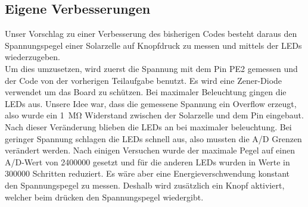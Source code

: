 \subsection{Eigene Verbesserungen}
Unser Vorschlag zu einer Verbesserung des bisherigen Codes besteht daraus den Spannungspegel einer Solarzelle auf Knopfdruck zu messen und mittels der LEDs wiederzugeben. \\ 
Um dies umzusetzen, wird zuerst die Spannung mit dem Pin PE2 gemessen und der Code von der vorherigen Teilaufgabe benutzt. Es wird eine Zener-Diode verwendet um das Board zu schützen.  Bei maximaler Beleuchtung gingen die LEDs aus. Unsere Idee war, dass die gemessene Spannung ein Overflow erzeugt, also wurde ein \SI{1}{\mega \ohm} Widerstand zwischen der Solarzelle und dem Pin eingebaut. Nach dieser Veränderung blieben die LEDs an bei maximaler beleuchtung. Bei geringer Spannung schlagen die LEDs schnell aus, also mussten die A/D Grenzen verändert werden. Nach einigen Versuchen wurde der maximale Pegel auf einen A/D-Wert von 2400000 gesetzt und für die anderen LEDs wurden in Werte in 300000 Schritten reduziert. Es wäre aber eine Energieverschwendung konstant den Spannungspegel zu messen. Deshalb wird zusätzlich ein Knopf aktiviert, welcher beim drücken den Spannungspegel wiedergibt.

